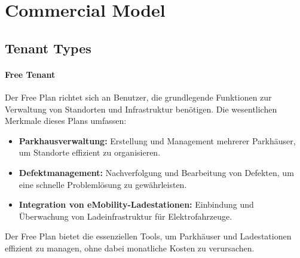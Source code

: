 \section{Commercial Model}
\subsection{Tenant Types}

\paragraph{Free Tenant}
Der Free Plan richtet sich an Benutzer, die grundlegende Funktionen zur Verwaltung von Standorten und Infrastruktur benötigen. Die wesentlichen Merkmale dieses Plans umfassen:
\begin{itemize}
    \item \textbf{Parkhausverwaltung:} Erstellung und Management mehrerer Parkhäuser, um Standorte effizient zu organisieren.
    \item \textbf{Defektmanagement:} Nachverfolgung und Bearbeitung von Defekten, um eine schnelle Problemlösung zu gewährleisten.
    \item \textbf{Integration von eMobility-Ladestationen:} Einbindung und Überwachung von Ladeinfrastruktur für Elektrofahrzeuge.
\end{itemize}
Der Free Plan bietet die essenziellen Tools, um Parkhäuser und Ladestationen effizient zu managen, ohne dabei monatliche Kosten zu verursachen.

